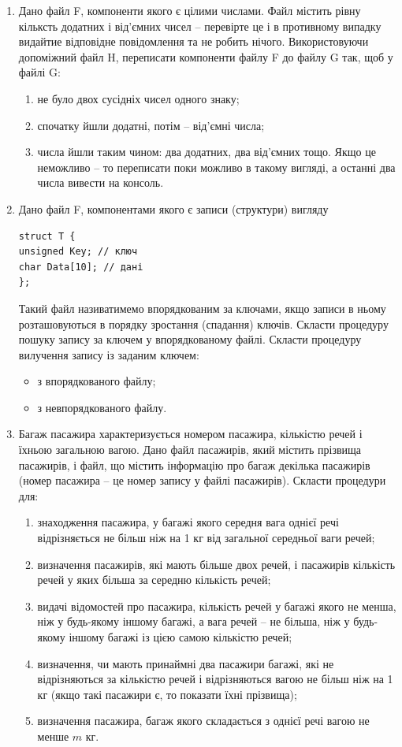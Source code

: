 \documentclass[a5paper,titlepage,openany,twoside,draft]{book_unv}%
\makeatletter
\newcommand{\xslalph}[1]{\expandafter\@xslalph\csname c@#1\endcsname}
\newcommand{\@xslalph}[1]{%
    \ifcase#1\or а\or б\or в\or г\or д\or e\or є\or ж\or з\or i%
    \or й\or к\or л\or м\or н\or о\or п\or р\or с\or т%
    \or у\or ф\or х\or ц\or ч\or ш\or ю\or я\or аа\or бб\or вв%
    \else\@ctrerr\fi%
}
\makeatother
\begin{document}
\begin{enumerate}
\item
  Дано файл F, компоненти якого є цілими числами. Файл містить рівну
кільксть додатних і від'ємних чисел -- перевірте це і в противному
  випадку видайтие відповідне повідомлення та не робить нічого.
  Використовуючи допоміжний файл H, переписати компоненти файлу F до
  файлу G так, щоб у файлі G:
\begin{enumerate}[label=\xslalph*)]
\item
не було двох сусідніх чисел одного знаку;
\item
спочатку йшли додатні, потім -- від'ємні числа;
\item
числа йшли таким чином: два додатних, два від'ємних тощо. Якщо це
неможливо -- то переписати поки можливо в такому вигляді, а останні два
числа вивести на консоль.
\end{enumerate}

\item
  Дано файл F, компонентами якого є записи (структури) вигляду
\begin{verbatim}
struct T {
unsigned Key; // ключ
char Data[10]; // дані
};
\end{verbatim}

Такий файл називатимемо впорядкованим за ключами, якщо записи в ньому
розташовуються в порядку зростання (спадання) ключів. Скласти процедуру
пошуку запису за ключем у впорядкованому файлі. Скласти процедуру
вилучення запису із заданим ключем:
\begin{itemize}
\item з впорядкованого файлу;
\item з невпорядкованого файлу.
\end{itemize}

\item
  Багаж пасажира характеризується номером пасажира, кількістю речей і
  їхньою загальною вагою. Дано файл пасажирів, який містить прізвища
  пасажирів, і файл, що містить інформацію про багаж декілька пасажирів
  (номер пасажира -- це номер запису у файлі пасажирів). 
Скласти процедури для:
  \begin{enumerate}[label=\xslalph*)]
\item
знаходження пасажира, у багажі якого середня вага однієї речі
відрізняється не більш ніж на 1 кг від загальної середньої ваги речей;
\item
визначення пасажирів, які мають більше двох речей, і пасажирів
кількість речей у яких більша за середню кількість речей;
\item
видачі відомостей про пасажира, кількість речей у багажі якого не
менша, ніж у будь-якому іншому багажі, а вага речей -- не більша, ніж у
будь-якому іншому багажі із цією самою кількістю речей;
\item
визначення, чи мають принаймні два пасажири багажі, які не
відрізняються за кількістю речей і відрізняються вагою не більш ніж на 1
кг (якщо такі пасажири є, то показати їхні прізвища);
\item визначення пасажира, багаж якого складається з однієї речі вагою не
менше $m$ кг.
  \end{enumerate}


\end{enumerate}
\end{document}
